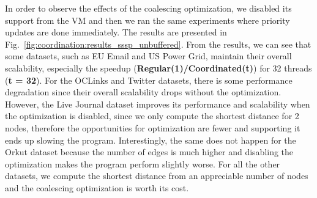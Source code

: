 In order to observe the effects of the coalescing optimization, we disabled its
support from the VM and then we ran the same experiments where priority updates
are done immediately. The results are presented in
Fig.~\ref{fig:coordination:results_sssp_unbuffered}. From the results, we can
see that some datasets, such as EU Email and US Power Grid, maintain their
overall scalability, especially the speedup (\textbf{Regular(1)/Coordinated(t)})
for 32 threads (\textbf{t = 32}). For the OCLinks and Twitter datasets, there is
some performance degradation since their overall scalability drops without the
optimization. However, the Live Journal dataset improves its performance and
scalability when the optimization is disabled, since we only compute the
shortest distance for 2 nodes, therefore the opportunities for optimization are
fewer and supporting it ends up slowing the program. Interestingly, the same
does not happen for the Orkut dataset because the number of edges is much higher
and disabling the optimization makes the program perform slightly worse.  For
all the other datasets, we compute the shortest distance from an appreciable
number of nodes and the coalescing optimization is worth its cost.




